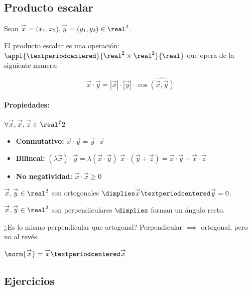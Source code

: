 \documentclass[palatino,nosec]{Docencia}
\renewcommand{\vx}{\overset{\rightarrow}{x}}
\renewcommand{\vy}{\overset{\rightarrow}{y}}
\renewcommand{\vz}{\overset{\rightarrow}{z}}
\begin{document}
\subsection{Producto escalar}

\begin{defn}
Sean $\vx=(x_1,x_2),\vy=(y_1,y_2)\in\real^2$. 

El producto escalar es una operación: $\appl{·}{\real^2\times\real^2}{\real}$ que opera de la siguiente manera: 

\[\vx·\vy = |\vx|·|\vy|·\cos{\hat{(\vx,\vy)}}\]
\end{defn}

\paragraph{Propiedades:} $\forall\vx,\vx,\vz\in\real^f2$

\begin{itemize}
	\item \textbf{Conmutativo: } $\vx·\vy = \vy·\vx$
	\item \textbf{Bilineal:}
	\subitem  $(λ\vx)·\vy=λ(\vx·\vy)$
	\subitem  $\vx·(\vy+\vz) = \vx·\vy + \vx·\vz$
	\item \textbf{No negatividad:} $\vx·\vx ≥0$
\end{itemize}


\begin{defn}[Ortogonalidad]
$\vx,\vy\in\real^2$ son ortogonales $\dimplies \vx·\vy=0$.
\end{defn}

\begin{defn}[Perpendicular]
$\vx,\vy\in\real^2$ son perpendiculares $\dimplies$ forman un ángulo recto.
\end{defn}

¿Es lo mismo perpendicular que ortogonal? Perpendicular $\implies$ ortogonal, pero no al revés.

\begin{defn}
	$\norm{\vx} = \vx·\vx$
\end{defn}


\subsection{Ejercicios}
\end{document}

